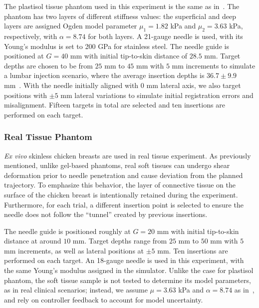The plastisol tissue phantom used in this experiment is the same as in~\parencite{wangSimulationbasedFlexibleNeedle2024}. The phantom has two layers of different stiffness values: the superficial and deep layers are assigned Ogden model parameter $\mu_1 = 1.82$ kPa and $\mu_2 = 3.63$ kPa, respectively, with $\alpha = 8.74$ for both layers. A 21-gauge needle is used, with its Young's modulus is set to 200 GPa for stainless steel. The needle guide is positioned at $G=40$ mm with initial tip-to-skin distance of $28.5$ mm. Target depths are chosen to be from $25$ mm to $45$ mm with $5$ mm increments to simulate a lumbar injection scenario, where the average insertion depths is $36.7 \pm 9.9$ mm~\parencite{fritzAugmentedRealityVisualization2012}. With the needle initially aligned with $0$ mm lateral axis, we also target positions with $\pm 5$ mm lateral variations to simulate initial registration errors and misalignment. Fifteen targets in total are selected and ten insertions are performed on each target. 

\subsubsection{Real Tissue Phantom}
\label{sec:chap--5-real-tissue}

\textit{Ex vivo} skinless chicken breasts are used in real tissue experiment. As previously mentioned, unlike gel-based phantoms, real soft tissues can undergo shear deformation prior to needle penetration and cause deviation from the planned trajectory. To emphasize this behavior, the layer of connective tissue on the surface of the chicken breast is intentionally retained during the experiment. Furthermore, for each trial, a different insertion point is selected to ensure the needle does not follow the ``tunnel'' created by previous insertions.

The needle guide is positioned roughly at $G=20$ mm with initial tip-to-skin distance at around $10$ mm. Target depths range from $25$ mm to $50$ mm with $5$ mm increments, as well as lateral positions at $\pm5$ mm. Ten insertions are performed on each target. An 18-gauge needle is used in this experiment, with the same Young's modulus assigned in the simulator. Unlike the case for plastisol phantom, the soft tissue sample is not tested to determine its model parameters, as in real clinical scenarios; instead, we assume $\mu=3.63$ kPa and $\alpha=8.74$ as in~\parencite{moVitroCompressiveProperties2020}, and rely on controller feedback to account for model uncertainty.

